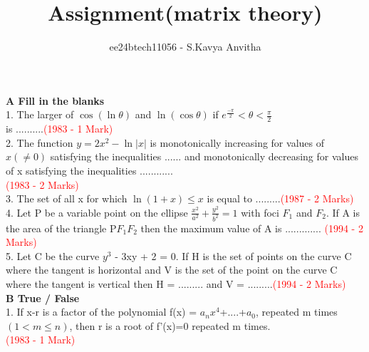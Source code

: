 \documentclass[journal,12pt,twocolumn]{IEEEtran}
\theoremstyle{remark}
\begin{document}

\vspace{3cm}

\title{Assignment(matrix theory)}
\author{ee24btech11056 - S.Kavya Anvitha}
\maketitle
\textbf{A Fill in the blanks}\\[6pt]
1.  The larger of $\cos (\ln \theta)$ and  $\ln (\cos \theta)$ if $e^{\frac{-\pi}{2}}< \theta< \frac{\pi}{2}$\\[2pt] 
\indent is ..........\hspace{4.3cm}\textcolor{red}{(1983 - 1 Mark)}\\[3pt]
 2.  The function $y=2x^{2}-\ln |x|$ is monotonically \indent increasing for values of $x(\neq0)$ satisfying the \indent inequalities ...... and monotonically decreasing for \indent values of x satisfying the inequalities ............\\[2pt]\indent\hspace{5.5cm}\textcolor{red}{(1983 - 2 Marks)}\\[3pt]
3.  The set of all x for which $\ln (1+x) \leq x$ is equal \indent to .........\hspace{4cm}\textcolor{red}{(1987 - 2 Marks)}\\[3pt]
4.  Let P be a variable point on the ellipse $\frac{x^2}{a^2}+\frac{y^2}{b^2} = 1$ \indent with foci $F_1$ and $F_2$. If A is the area of the \indent triangle P$F_1$$F_2$ then the maximum value of A is \hspace{5cm}\indent............. \hspace{3.6cm} \textcolor{red}{(1994 - 2 Marks)}\\[3pt]
5.  Let C be the curve $y^3$ - 3xy + 2 = 0. If H is the \indent set of points on the curve C where the tangent \indent is horizontal and V is the set of the point on the \indent curve C where the tangent is vertical then H = \indent ......... and V = .........\hspace{1.7cm}\textcolor{red}{(1994 - 2 Marks)}\\[6pt]
\indent\hspace{0.3cm}\textbf{B True / False}\\[6pt]
1. If x-r is a factor of the polynomial f(x) = \indent $a_n$$x^4$+....+$a_0$, repeated m times $(1< m\leq n)$, then \indent r is a root of f'(x)=0 repeated m times.\\[2pt]
\indent \hspace{5.5cm}\textcolor{red}{(1983 - 1 Mark)}\\[3pt]
\end{document}
